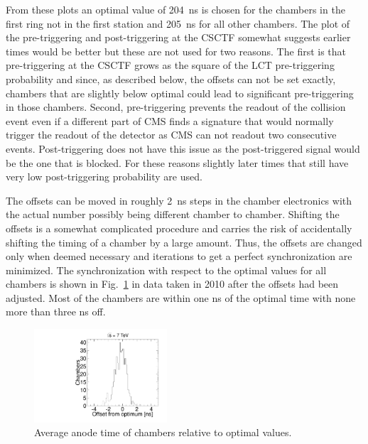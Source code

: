 From these plots an optimal value of 204~ns is chosen for the chambers in the first ring not in the first station and 205~ns for all other chambers.
The plot of the pre-triggering and post-triggering at the CSCTF somewhat suggests earlier times would be better but these are not used for two reasons.
The first is that pre-triggering at the CSCTF grows as the square of the LCT pre-triggering probability and since, as described below, the offsets can not be set exactly, chambers
that are slightly below optimal could lead to significant pre-triggering in those chambers. Second, pre-triggering prevents the readout
of the collision event even if a different part of CMS finds a signature that would normally trigger the readout of the detector as
CMS can not readout two consecutive events. Post-triggering does not have this issue as the post-triggered signal would be the one that is blocked.
For these reasons slightly later times that still have very low post-triggering probability are used.

The offsets can be moved in roughly 2~ns steps in the chamber electronics with the actual number possibly being different chamber to chamber. Shifting the offsets is a
somewhat complicated procedure and carries the risk of accidentally shifting the timing of a chamber by a large amount. Thus, the offsets are changed only
when deemed necessary and iterations to get a perfect synchronization are minimized. The synchronization with respect to the optimal values for all chambers
is shown in Fig.~\ref{fig:average_anodes} in data taken in 2010 after the offsets had been adjusted.
Most of the chambers are within one ns of the optimal time with none more than three ns off.

\begin{figure}
  \begin{center}
      \includegraphics[clip=true, trim=0.0cm 0cm 0.0cm 0cm, width=0.44\textwidth]{figures/timing/average_anodes}
      \caption[Average anode time of chambers relative to optimal values.]
      {Average anode time of chambers relative to optimal values.
        }
      \label{fig:average_anodes}
  \end{center}
\end{figure}

